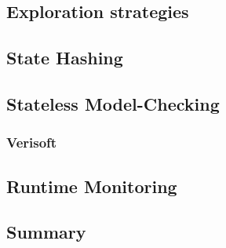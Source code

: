 \documentclass[12pt, a4paper]{book}
\begin{document}
  \subsection{Exploration strategies}
  \label{sub:Exploration strategies}
  \subsection{State Hashing}
  \label{sub:State Hashing}
  \subsection{Stateless Model-Checking}
  \label{sub:Stateless Model-Checking}
  \subsubsection{Verisoft}
  \label{subs:Verisoft}
  \subsection{Runtime Monitoring}
  \label{sub:Runtime Monitoring}
  \subsection{Summary}
  \label{sub:Summary}
\end{document}
